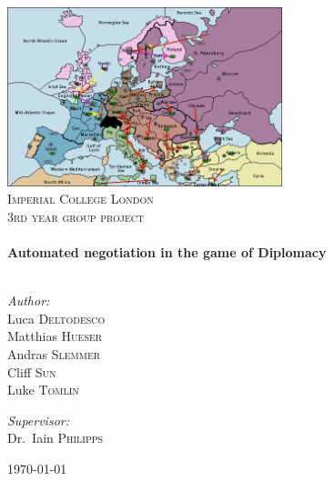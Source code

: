\begin{titlepage}

\begin{center}

\includegraphics[width=0.60\textwidth]{./report4_titlelogo}\\[1cm]    

\textsc{\LARGE Imperial College London}\\[1.5cm]

\textsc{\Large 3rd year group project}\\[0.5cm]

\HRule \\[0.4cm]
{ \huge \bfseries Automated negotiation in the game of Diplomacy}\\[0.4cm]

\HRule \\[1.5cm]

\begin{minipage}{0.4\textwidth}
\begin{flushleft} \large
\emph{Author:}\\
Luca \textsc{Deltodesco} \\
Matthias \textsc{Hueser} \\
Andras \textsc{Slemmer} \\
Cliff \textsc{Sun} \\
Luke \textsc{Tomlin} \\
\end{flushleft}
\end{minipage}
\begin{minipage}{0.4\textwidth}
\begin{flushright} \large
\emph{Supervisor:} \\
Dr.~Iain \textsc{Philipps}
\end{flushright}
\end{minipage}

\vfill

{\large \today}

\end{center}

\end{titlepage}
